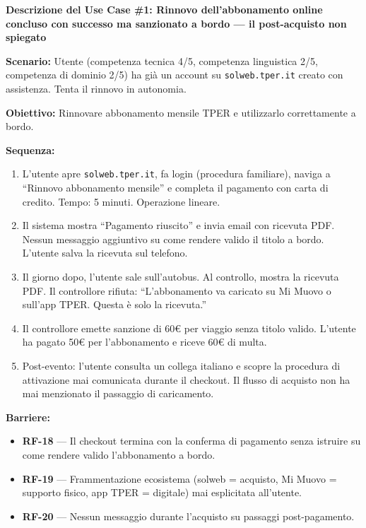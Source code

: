 ﻿\documentclass[11pt,a4paper]{article}
\begin{document}

\begin{tcolorbox}[sectionbox,colback=primaryColor!10]
    \textbf{Descrizione del Use Case \#1: Rinnovo dell'abbonamento online concluso con successo ma sanzionato a bordo --- il post-acquisto non spiegato}
\end{tcolorbox}

\vspace{0.3cm}

\begin{tcolorbox}[base]
    {\small
    \textbf{Scenario:} Utente (competenza tecnica 4/5, competenza linguistica 2/5, competenza di dominio 2/5) ha già un account su \texttt{solweb.tper.it} creato con assistenza. Tenta il rinnovo in autonomia.

    \textbf{Obiettivo:} Rinnovare abbonamento mensile TPER e utilizzarlo correttamente a bordo.

    \textbf{Sequenza:}
    \begin{enumerate}
        \item L'utente apre \texttt{solweb.tper.it}, fa login (procedura familiare), naviga a ``Rinnovo abbonamento mensile'' e completa il pagamento con carta di credito. Tempo: 5 minuti. Operazione lineare.
        \item Il sistema mostra ``Pagamento riuscito'' e invia email con ricevuta PDF. Nessun messaggio aggiuntivo su come rendere valido il titolo a bordo. L'utente salva la ricevuta sul telefono.
        \item Il giorno dopo, l'utente sale sull'autobus. Al controllo, mostra la ricevuta PDF. Il controllore rifiuta: ``L'abbonamento va caricato su Mi Muovo o sull'app TPER. Questa è solo la ricevuta.''
        \item Il controllore emette sanzione di 60\euro{} per viaggio senza titolo valido. L'utente ha pagato 50\euro{} per l'abbonamento e riceve 60\euro{} di multa.
        \item Post-evento: l'utente consulta un collega italiano e scopre la procedura di attivazione mai comunicata durante il checkout. Il flusso di acquisto non ha mai menzionato il passaggio di caricamento.
    \end{enumerate}

    \textbf{Barriere:}
    \begin{itemize}
        \item \textbf{RF-18} --- Il checkout termina con la conferma di pagamento senza istruire su come rendere valido l'abbonamento a bordo.
        \item \textbf{RF-19} --- Frammentazione ecosistema (solweb = acquisto, Mi Muovo = supporto fisico, app TPER = digitale) mai esplicitata all'utente.
        \item \textbf{RF-20} --- Nessun messaggio durante l'acquisto su passaggi post-pagamento.
    \end{itemize}

}
\end{tcolorbox}
\end{document}
